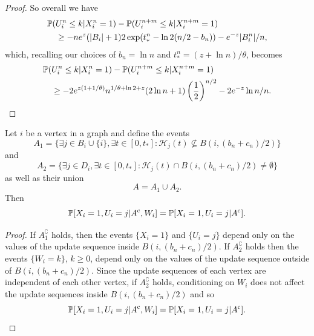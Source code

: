 \begin{proof}
		So overall we have
		\begin{align}
			\mathbb{P}(&U_i^n \leq k | X_i^n = 1) - \mathbb{P}(U_i^{n+m} \leq k | X_i^{n+m} = 1) \notag \\ 
			&\geq - n e^{z} (|B_i| + 1) 2\exp(t_*^n - \ln 2 (n/2 - b_n)) - e^{-z} |B_i^n| / n,
		\end{align}
		which, recalling our choices of $b_n = \ln n$ and $t_*^n = (z + \ln n) / \theta$, becomes
		\begin{align}
			\mathbb{P}(&U_i^n \leq k | X_i^n = 1) - \mathbb{P}(U_i^{n+m} \leq k | X_i^{n+m} = 1) \notag \\ 
			&\geq - 2 e^{z(1 + 1/\theta)} n^{1/\theta + \ln 2 + z}(2\ln n + 1) \left(\frac{1}{2}\right)^{n/2} - 2 e^{-z} \ln n / n.
		\end{align}

	\end{proof}
	

	\begin{lemma}
	\label{lem:conditioning on A removes conditioning on W}
		Let $i$ be a vertex in a graph and 
		define the events
		\begin{equation}
			A_1 = \{\exists j \in B_i \cup \{i\}, \exists t \in [0, t_*] : \mathcal{H}_j(t) \nsubseteq  B(i, (b_n + c_n)/2)\}
		\end{equation}
		and
		\begin{equation}
			A_2 = \{\exists j \in D_i, \exists t \in [0, t_*] : \mathcal{H}_j(t) \cap B(i, (b_n + c_n)/2) \neq \emptyset\}
		\end{equation}
		as well as their union
		\begin{equation}
			A = A_1 \cup A_2.
		\end{equation}
		Then
		\begin{equation}
			\mathbb{P}[X_i = 1, U_i = j | A^{\mathrm{c}}, W_i] = \mathbb{P}[X_i = 1, U_i = j | A^{\mathrm{c}}].
		\end{equation}
	\end{lemma}
	\begin{proof}
		If $A_1^\complement$ holds, then the events $\{X_i = 1\}$ and $\{U_i = j\}$ depend only on the values of the update sequence inside $B(i, (b_n + c_n)/2)$. If $A_2^\complement$ holds then the events $\{W_i = k\}$, $k \geq 0$, depend only on the values of the update sequence outside of $B(i, (b_n + c_n)/2)$. Since the update sequences of each vertex are independent of each other vertex, if $A_2^\complement$ holds, conditioning on $W_i$ does not affect the update sequences inside $B(i, (b_n + c_n)/2)$ and so 
		\begin{equation}
			\mathbb{P}[X_i = 1, U_i = j | A^{\mathrm{c}}, W_i] = \mathbb{P}[X_i = 1, U_i = j | A^{\mathrm{c}}].
		\end{equation}
	\end{proof}

